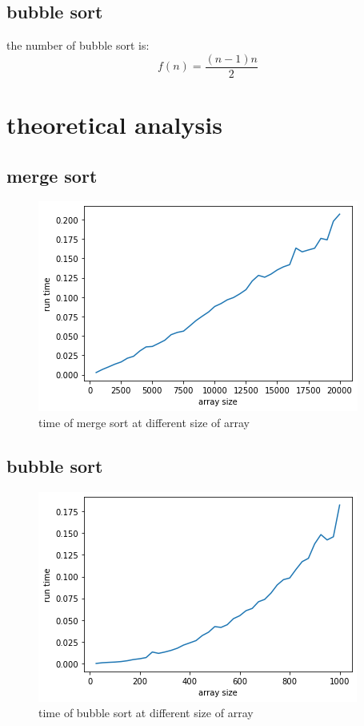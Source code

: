 \documentclass{article}
\begin{document}
\subsection{bubble sort}
the number of bubble sort is:
\[
f(n) = \frac{(n-1)n}{2}
\]

\section{theoretical analysis}
\subsection{merge sort}
\begin{figure}[H]
    \centering
    \includegraphics[scale=0.7]{mergeresult1.png}
    \caption{time of merge sort at different size of array}
\end{figure}
\subsection{bubble sort}
\begin{figure}[H]
    \centering
    \includegraphics[scale=0.7]{bubbleresult1.png}
    \caption{time of bubble sort at different size of array}
\end{figure}
\end{document}
